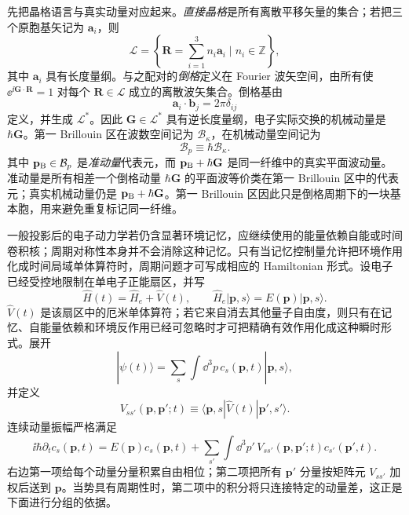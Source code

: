 先把晶格语言与真实动量对应起来。\emph{直接晶格}是所有离散平移矢量的集合；若把三个原胞基矢记为 $\mathbf a_i$，则
\begin{equation*}
\mathcal L=\left\{\mathbf R=\sum_{i=1}^3n_i\mathbf a_i\mid n_i\in\mathbb Z\right\},
\end{equation*}
其中 $\mathbf a_i$ 具有长度量纲。与之配对的\emph{倒格}定义在 Fourier 波矢空间，由所有使 $\ee^{\ii\mathbf G\cdot\mathbf R}=1$ 对每个 $\mathbf R\in\mathcal L$ 成立的离散波矢集合。倒格基由
\begin{equation*}
\mathbf a_i\cdot\mathbf b_j=2\pi\delta_{ij}
\end{equation*}
定义，并生成 $\mathcal L^*$。因此 $\mathbf G\in\mathcal L^*$ 具有逆长度量纲，电子实际交换的机械动量是 $\hbar\mathbf G$。第一 Brillouin 区在波数空间记为 $\mathcal B_{\kappa}$，在机械动量空间记为
\begin{equation*}
\mathcal B_p\equiv\hbar\mathcal B_{\kappa}.
\end{equation*}
其中 $\mathbf p_{\rm B}\in\mathcal B_p$ 是\emph{准动量}代表元，而 $\mathbf p_{\rm B}+\hbar\mathbf G$ 是同一纤维中的真实平面波动量。准动量是所有相差一个倒格动量 $\hbar\mathbf G$ 的平面波等价类在第一 Brillouin 区中的代表元；真实机械动量仍是 $\mathbf p_{\rm B}+\hbar\mathbf G$。第一 Brillouin 区因此只是倒格周期下的一块基本胞，用来避免重复标记同一纤维。

一般投影后的电子动力学若仍含显著环境记忆，应继续使用的能量依赖自能或时间卷积核；周期对称性本身并不会消除这种记忆。只有当记忆控制量允许把环境作用化成时间局域单体算符时，周期问题才可写成相应的 Hamiltonian 形式。设电子已经受控地限制在单电子正能扇区，并写
\begin{equation}
\boxed{
\hat H(t)=\hat H_e+\hat V(t),
\qquad
\hat H_e|\mathbf p,s\rangle=E(\mathbf p)|\mathbf p,s\rangle .}
\label{eq:arbitrary_single_electron_hamiltonian}
\end{equation}
$\hat V(t)$ 是该扇区中的厄米单体算符；若它来自消去其他量子自由度，则只有在记忆、自能量依赖和环境反作用已经可忽略时才可把精确有效作用化成这种瞬时形式。展开
\begin{equation*}
|\psi(t)\rangle=\sum_s\int\dd^3 p\,c_s(\mathbf p,t)|\mathbf p,s\rangle,
\end{equation*}
并定义
\begin{equation*}
V_{ss'}(\mathbf p,\mathbf p';t)
\equiv\langle\mathbf p,s|\hat V(t)|\mathbf p',s'\rangle .
\end{equation*}
连续动量振幅严格满足
\begin{equation}
\boxed{
\ii\hbar\partial_t c_s(\mathbf p,t)
=E(\mathbf p)c_s(\mathbf p,t)
+\sum_{s'}\int\dd^3 p'\,
V_{ss'}(\mathbf p,\mathbf p';t)c_{s'}(\mathbf p',t).}
\label{eq:arbitrary_potential_continuous_momentum_equation}
\end{equation}
右边第一项给每个动量分量积累自由相位；第二项把所有 $\mathbf p'$ 分量按矩阵元 $V_{ss'}$ 加权后送到 $\mathbf p$。当势具有周期性时，第二项中的积分将只连接特定的动量差，这正是下面进行分组的依据。

